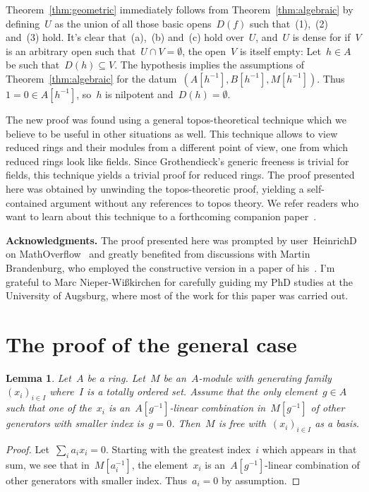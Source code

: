 \documentclass{amsart}
\theoremstyle{definition}
\theoremstyle{plain}
\newtheorem{lemma}[defn]{Lemma}
\theoremstyle{remark}
\begin{document}
Theorem~\ref{thm:geometric} immediately follows from
Theorem~\ref{thm:algebraic} by defining~$U$ as the union of all those basic
opens~$D(f)$ such that~(1),~(2) and~(3) hold. It's clear that~(a),~(b)
and~(c) hold over~$U$, and~$U$ is dense for if~$V$ is an arbitrary open
such that~$U \cap V = \emptyset$, the open~$V$ is itself empty: Let~$h \in A$ be
such that~$D(h) \subseteq V$. The hypothesis implies the assumptions of
Theorem~\ref{thm:algebraic} for the datum~$(A[h^{-1}], B[h^{-1}], M[h^{-1}])$.
Thus~$1 = 0 \in A[h^{-1}]$, so~$h$ is nilpotent and~$D(h) = \emptyset$.

The new proof was found using a general topos-theoretical technique which we
believe to be useful in other situations as well. This technique allows to view
reduced rings and their modules from a different point of view, one from which
reduced rings look like fields. Since Grothendieck's generic freeness
is trivial for fields, this technique yields a trivial proof for reduced rings.
The proof presented here was obtained by unwinding the topos-theoretic proof,
yielding a self-contained argument without any references to topos theory.
We refer readers who want to learn about this technique to a forthcoming companion 
paper~\cite{blechschmidt:wlog}.

\textbf{Acknowledgments.} The proof presented here was prompted by
user~HeinrichD on MathOverflow~\cite{mo:kernel} and greatly
benefited from discussions with Martin Brandenburg, who employed the constructive
version in a paper of his~\cite{brandenburg:schur}. I'm grateful to Marc
Nieper-Wißkirchen for carefully guiding my PhD studies at the University of
Augsburg, where most of the work for this paper was carried out.


\section{The proof of the general case}

\begin{lemma}\label{lemma:basis}
Let~$A$ be a ring. Let~$M$ be an~$A$-module with generating
family~$(x_i)_{i \in I}$ where~$I$ is a totally ordered set. Assume that the
only element~$g \in A$ such that one of the~$x_i$ is an~$A[g^{-1}]$-linear
combination in~$M[g^{-1}]$ of other generators with smaller index is~$g = 0$.
Then~$M$ is free with~$(x_i)_{i \in I}$ as a basis.
\end{lemma}

\begin{proof}Let~$\sum_i a_i x_i = 0$. Starting with the greatest
index~$i$ which appears in that sum, we see that in~$M[a_i^{-1}]$, the
element~$x_i$ is an~$A[g^{-1}]$-linear combination of other generators with
smaller index. Thus~$a_i = 0$ by assumption.\end{proof}
\end{document}
